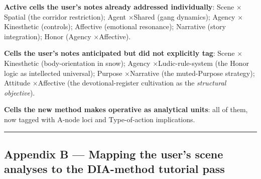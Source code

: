 \documentclass[11pt]{report}
\begin{document}
\begin{table}[H]
\end{table}


\textbf{Active cells the user's notes already addressed individually}: Scene $\times$\allowbreak  Spatial (the corridor restriction); Agent $\times$\allowbreak  Shared (gang dynamics); Agency $\times$\allowbreak  Kinesthetic (controls); Affective (emotional resonance); Narrative (story integration); Honor (Agency $\times$\allowbreak  Affective).


\textbf{Cells the user's notes anticipated but did not explicitly tag}: Scene $\times$\allowbreak  Kinesthetic (body-orientation in snow); Agency $\times$\allowbreak  Ludic-rule-system (the Honor logic as intellected universal); Purpose $\times$\allowbreak  Narrative (the muted-Purpose strategy); Attitude $\times$\allowbreak  Affective (the devotional-register cultivation as the \textit{structural objective}).


\textbf{Cells the new method makes operative as analytical units}: all of them, now tagged with A-node loci and Type-of-action implications.


\vspace{0.4em}\hrule\vspace{0.8em}


\subsection{Appendix B — Mapping the user's scene analyses to the DIA-method tutorial pass}
\end{document}
